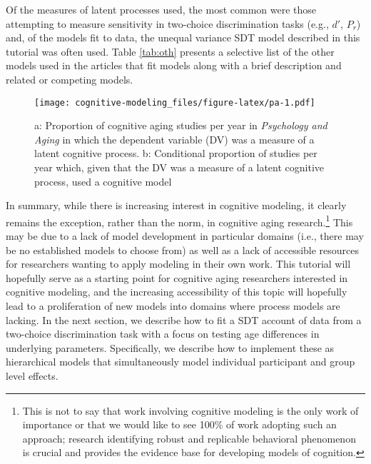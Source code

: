 \documentclass[
  english,
  ,man,floatsintext]{apa6}
\begin{document}
Of the measures of latent processes used, the most common were those attempting to measure sensitivity in two-choice discrimination tasks (e.g., \(d'\), \(P_r\)) and, of the models fit to data, the unequal variance SDT model described in this tutorial was often used. Table \ref{tab:oth} presents a selective list of the other models used in the articles that fit models along with a brief description and related or competing models.

\begin{figure}
\centering
\texttt{[image: cognitive-modeling\_files/figure-latex/pa-1.pdf]}
\caption{\label{fig:pa}a: Proportion of cognitive aging studies per year in \emph{Psychology and Aging} in which the dependent variable (DV) was a measure of a latent cognitive process. b: Conditional proportion of studies per year which, given that the DV was a measure of a latent cognitive process, used a cognitive model}
\end{figure}

In summary, while there is increasing interest in cognitive modeling, it clearly remains the exception, rather than the norm, in cognitive aging research.\footnote{This is not to say that work involving cognitive modeling is the only work of importance or that we would like to see 100\% of work adopting such an approach; research identifying robust and replicable behavioral phenomenon is crucial and provides the evidence base for developing models of cognition.} This may be due to a lack of model development in particular domains (i.e., there may be no established models to choose from) as well as a lack of accessible resources for researchers wanting to apply modeling in their own work. This tutorial will hopefully serve as a starting point for cognitive aging researchers interested in cognitive modeling, and the increasing accessibility of this topic will hopefully lead to a proliferation of new models into domains where process models are lacking. In the next section, we describe how to fit a SDT account of data from a two-choice discrimination task with a focus on testing age differences in underlying parameters. Specifically, we describe how to implement these as hierarchical models that simultaneously model individual participant and group level effects.
\end{document}
